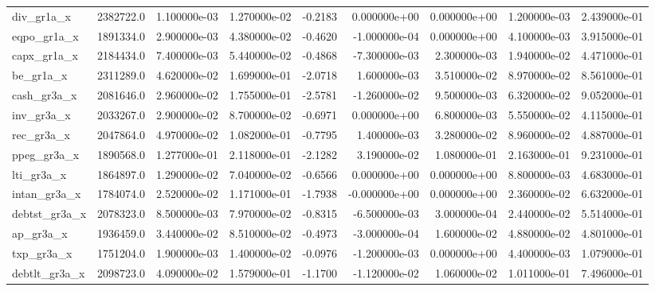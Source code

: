 \documentclass[12pt]{article}
\begin{document}
\begin{landscape}
\begin{longtable}{|l|r|r|r|r|r|r|r|r|}
div\_gr1a\_x              &  2382722.0 &  1.100000e-03 &  1.270000e-02 &     -0.2183 &  0.000000e+00 &  0.000000e+00 &  1.200000e-03 &  2.439000e-01 \\
eqpo\_gr1a\_x             &  1891334.0 &  2.900000e-03 &  4.380000e-02 &     -0.4620 & -1.000000e-04 &  0.000000e+00 &  4.100000e-03 &  3.915000e-01 \\
capx\_gr1a\_x             &  2184434.0 &  7.400000e-03 &  5.440000e-02 &     -0.4868 & -7.300000e-03 &  2.300000e-03 &  1.940000e-02 &  4.471000e-01 \\
be\_gr1a\_x               &  2311289.0 &  4.620000e-02 &  1.699000e-01 &     -2.0718 &  1.600000e-03 &  3.510000e-02 &  8.970000e-02 &  8.561000e-01 \\
cash\_gr3a\_x             &  2081646.0 &  2.960000e-02 &  1.755000e-01 &     -2.5781 & -1.260000e-02 &  9.500000e-03 &  6.320000e-02 &  9.052000e-01 \\
inv\_gr3a\_x              &  2033267.0 &  2.900000e-02 &  8.700000e-02 &     -0.6971 &  0.000000e+00 &  6.800000e-03 &  5.550000e-02 &  4.115000e-01 \\
rec\_gr3a\_x              &  2047864.0 &  4.970000e-02 &  1.082000e-01 &     -0.7795 &  1.400000e-03 &  3.280000e-02 &  8.960000e-02 &  4.887000e-01 \\
ppeg\_gr3a\_x             &  1890568.0 &  1.277000e-01 &  2.118000e-01 &     -2.1282 &  3.190000e-02 &  1.080000e-01 &  2.163000e-01 &  9.231000e-01 \\
lti\_gr3a\_x              &  1864897.0 &  1.290000e-02 &  7.040000e-02 &     -0.6566 &  0.000000e+00 &  0.000000e+00 &  8.800000e-03 &  4.683000e-01 \\
intan\_gr3a\_x            &  1784074.0 &  2.520000e-02 &  1.171000e-01 &     -1.7938 & -0.000000e+00 &  0.000000e+00 &  2.360000e-02 &  6.632000e-01 \\
debtst\_gr3a\_x           &  2078323.0 &  8.500000e-03 &  7.970000e-02 &     -0.8315 & -6.500000e-03 &  3.000000e-04 &  2.440000e-02 &  5.514000e-01 \\
ap\_gr3a\_x               &  1936459.0 &  3.440000e-02 &  8.510000e-02 &     -0.4973 & -3.000000e-04 &  1.600000e-02 &  4.880000e-02 &  4.801000e-01 \\
txp\_gr3a\_x              &  1751204.0 &  1.900000e-03 &  1.400000e-02 &     -0.0976 & -1.200000e-03 &  0.000000e+00 &  4.400000e-03 &  1.079000e-01 \\
debtlt\_gr3a\_x           &  2098723.0 &  4.090000e-02 &  1.579000e-01 &     -1.1700 & -1.120000e-02 &  1.060000e-02 &  1.011000e-01 &  7.496000e-01 \\

\end{longtable}
\end{landscape}
\end{document}
